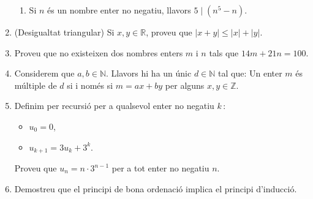 \begin{enumerate}
\begin{enumerate}
\item Si $n$ \'{e}s un nombre enter no negatiu, llavors $5\mid\left(
n^{5}-n\right)  $.
\end{enumerate}

\item (Desigualtat triangular) Si $x,y\in\mathbb{R}$, proveu que $\left\vert
x+y\right\vert \leq\left\vert x\right\vert +\left\vert y\right\vert $.

\item Proveu que no existeixen dos nombres enters $m$ i $n$ tals que
$14m+21n=100$.

\item Considerem que $a,b\in\mathbb{N}$. Llavors hi ha un \'{u}nic
$d\in\mathbb{N}$ tal que: Un enter $m$ \'{e}s m\'{u}ltiple de $d$ si i
nom\'{e}s si $m=ax+by$ per alguns $x,y\in\mathbb{Z}$.

\item Definim per recursi\'{o} per a qualsevol enter no negatiu $k\,:$

\begin{itemize}
\item $u_{0}=0$,

\item $u_{k+1}=3u_{k}+3^{k}$.
\end{itemize}

Proveu que $u_{n}=n\cdot3^{n-1}$ per a tot enter no negatiu $n$.

\item Demostreu que el principi de bona ordenaci\'{o} implica el principi d'inducci\'{o}.

\end{enumerate}
